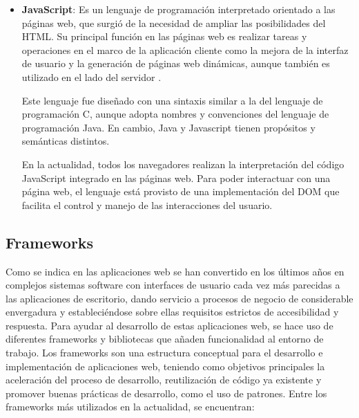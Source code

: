 \begin{itemize}
\item \textbf{JavaScript}: Es un lenguaje de programación interpretado orientado a las páginas web, que surgió de la necesidad de ampliar las posibilidades del HTML. Su principal función en las páginas web es realizar tareas y operaciones en el marco de la aplicación cliente como la mejora de la interfaz de usuario y la generación de páginas web dinámicas, aunque también es utilizado en el lado del servidor .

Este lenguaje fue diseñado con una sintaxis similar a la del lenguaje de programación C, aunque adopta nombres y convenciones del lenguaje de programación Java. En cambio, Java y Javascript tienen propósitos y semánticas distintos.

En la actualidad, todos los navegadores realizan la interpretación del código JavaScript integrado en las páginas web. Para poder interactuar con una página web, el lenguaje está provisto de una implementación del DOM que facilita el control y manejo de las interacciones del usuario.

\end{itemize}

\subsection{Frameworks}
\label{sec:frameworks}

Como se indica en \cite{garrido2004arquitectura} las aplicaciones web se han convertido en los últimos años en complejos sistemas software con interfaces de usuario cada vez más parecidas a las aplicaciones de escritorio, dando servicio a procesos de negocio de considerable envergadura y estableciéndose sobre ellas requisitos estrictos de accesibilidad y respuesta. Para ayudar al desarrollo de estas aplicaciones web, se hace uso de diferentes frameworks y bibliotecas que añaden funcionalidad al entorno de trabajo. Los frameworks son una estructura conceptual para el desarrollo e implementación de aplicaciones web, teniendo como objetivos principales la aceleración del proceso de desarrollo, reutilización de código ya existente y promover buenas prácticas de desarrollo, como el uso de patrones. Entre los frameworks más utilizados en la actualidad, se encuentran:

